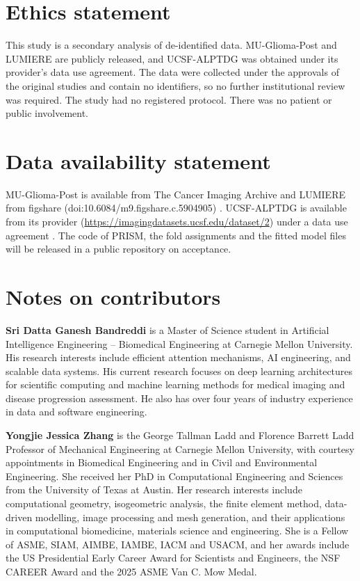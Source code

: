 \documentclass[largeformat]{interact} %
\begin{document}
\section*{Ethics statement}
This study is a secondary analysis of de-identified data. MU-Glioma-Post and LUMIERE are publicly released, and
UCSF-ALPTDG was obtained under its provider's data use agreement. The data were collected under the approvals of the
original studies \citep{mahmoud2025,suter2022,fields2024} and contain no identifiers, so no further institutional
review was required. The study had no registered protocol. There was no
patient or public involvement.

\section*{Data availability statement}
MU-Glioma-Post is available from The Cancer Imaging Archive \citep{yaseen2025tcia} and LUMIERE from figshare (doi:10.6084/m9.figshare.c.5904905)
\citep{suter2022}. UCSF-ALPTDG is available from its provider
(\url{https://imagingdatasets.ucsf.edu/dataset/2}) under a data use agreement \citep{fields2024}.
The code of PRISM, the fold assignments and the fitted model files will be released in a public repository on
acceptance.

\section*{Notes on contributors}
\textbf{Sri Datta Ganesh Bandreddi} is a Master of Science student in Artificial Intelligence Engineering --
Biomedical Engineering at Carnegie Mellon University. His research interests include efficient attention mechanisms,
AI engineering, and scalable data systems. His current research focuses on deep learning architectures for
scientific computing and machine learning methods for medical imaging and disease progression assessment. He also has
over four years of industry experience in data and software engineering.

\textbf{Yongjie Jessica Zhang} is the George Tallman Ladd and Florence Barrett Ladd Professor of Mechanical
Engineering at Carnegie Mellon University, with courtesy appointments in Biomedical Engineering and in Civil and
Environmental Engineering. She received her PhD in Computational Engineering and Sciences from the University of
Texas at Austin. Her research interests include computational geometry, isogeometric analysis, the finite element
method, data-driven modelling, image processing and mesh generation, and their applications in computational
biomedicine, materials science and engineering. She is a Fellow of ASME, SIAM, AIMBE, IAMBE, IACM and USACM, and her
awards include the US Presidential Early Career Award for Scientists and Engineers, the NSF CAREER Award and the
2025 ASME Van C. Mow Medal.


\end{document}
